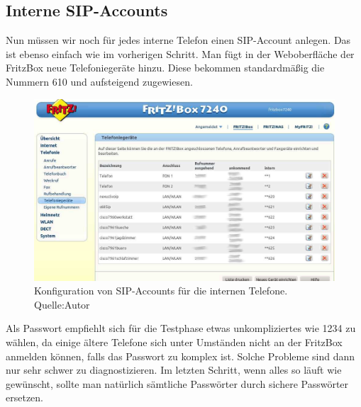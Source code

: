 \documentclass[a4paper,12pt]{scrbook}
\begin{document}
\subsection{Interne SIP-Accounts}
Nun müssen wir noch für jedes interne Telefon einen SIP-Account anlegen. Das ist ebenso einfach wie im vorherigen Schritt. Man fügt in der Weboberfläche 
der FritzBox neue Telefoniegeräte hinzu. Diese bekommen standardmäßig die Nummern 610 und aufsteigend zugewiesen. 

\begin{figure}[H]
\begin{center}
\includegraphics[width=1\hsize]{./images/voip-server-fritzbox-telefoniegeraete.png}
\end{center}
\caption[Konfiguration von SIP-Accounts für die internen Telefone.]
{\label{voip-server-fritzbox-intsip}Konfiguration von SIP-Accounts für die internen Telefone. Quelle:Autor}
\end{figure}

Als Passwort empfiehlt sich für die Testphase etwas 
unkompliziertes wie 1234 zu wählen, da einige ältere Telefone sich unter Umständen nicht an der FritzBox anmelden können, falls das Passwort zu komplex ist.
Solche Probleme sind dann nur sehr schwer zu diagnostizieren. Im letzten Schritt, wenn alles so läuft wie gewünscht, sollte man natürlich sämtliche Passwörter
durch sichere Passwörter ersetzen.
\end{document}
